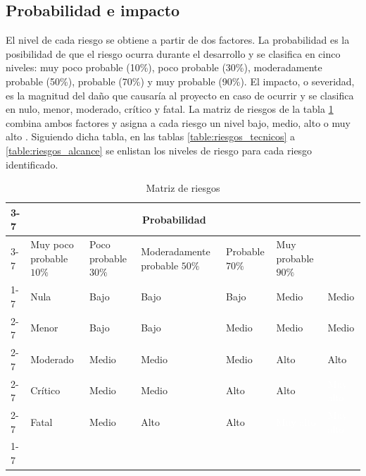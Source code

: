 \subsection{Probabilidad e impacto}

El nivel de cada riesgo se obtiene a partir de dos factores. La probabilidad es la posibilidad de que el riesgo ocurra durante el desarrollo y se clasifica en cinco niveles: muy poco probable (10\%), poco probable (30\%), moderadamente probable (50\%), probable (70\%) y muy probable (90\%). El impacto, o severidad, es la magnitud del daño que causaría al proyecto en caso de ocurrir y se clasifica en nulo, menor, moderado, crítico y fatal. La matriz de riesgos de la tabla \ref{table:matriz_riesgos} combina ambos factores y asigna a cada riesgo un nivel bajo, medio, alto o muy alto \cite{matriz_riesgos}. Siguiendo dicha tabla, en las tablas \ref{table:riesgos_tecnicos} a \ref{table:riesgos_alcance} se enlistan los niveles de riesgo para cada riesgo identificado.

\begin{table}[H]
	\centering
	\renewcommand{\arraystretch}{1.2}
	\setlength{\tabcolsep}{3pt}
	\begin{tabular}{|p{}|p{}|p{}|p{}|p{}|p{}|p{}|}
		\cline{3-7}
		\multicolumn{2}{p{0.12\textwidth}}{} & \multicolumn{5}{|c|}{\textbf{Probabilidad}} \\ \cline{3-7}
		\multicolumn{2}{p{0.12\textwidth}|}{} & Muy poco probable $10\%$ & Poco probable $30\%$ & Modera\-da\-men\-te probable $50\%$ & Probable $70\%$ & Muy probable $90\%$ \\ \cline{1-7}
		\multirow{5}{*}{\textbf{Severidad}} 
		& Nula & \cellcolor{green!30}Bajo & \cellcolor{green!30}Bajo & \cellcolor{green!30}Bajo & \cellcolor{yellow!40}Medio & \cellcolor{yellow!40}Medio \\ \cline{2-7}
		& Menor & \cellcolor{green!30}Bajo & \cellcolor{green!30}Bajo & \cellcolor{yellow!40}Medio & \cellcolor{yellow!40}Medio & \cellcolor{yellow!40}Medio \\ \cline{2-7}
		& Moderado & \cellcolor{yellow!40}Medio & \cellcolor{yellow!40}Medio & \cellcolor{yellow!40}Medio & \cellcolor{red!40}Alto & \cellcolor{red!40}Alto \\ \cline{2-7}
		& Crítico & \cellcolor{yellow!40}Medio & \cellcolor{yellow!40}Medio & \cellcolor{red!40}Alto & \cellcolor{red!40}Alto & \cellcolor{black!80}\textcolor{white}{Muy alto} \\ \cline{2-7}
		& Fatal & \cellcolor{yellow!40}Medio & \cellcolor{red!40}Alto & \cellcolor{red!40}Alto & \cellcolor{black!80}\textcolor{white}{Muy alto} & \cellcolor{black!80}\textcolor{white}{Muy alto} \\ \cline{1-7}
	\end{tabular}
	\caption{Matriz de riesgos \cite{matriz_riesgos}}
	\label{table:matriz_riesgos}
\end{table}

